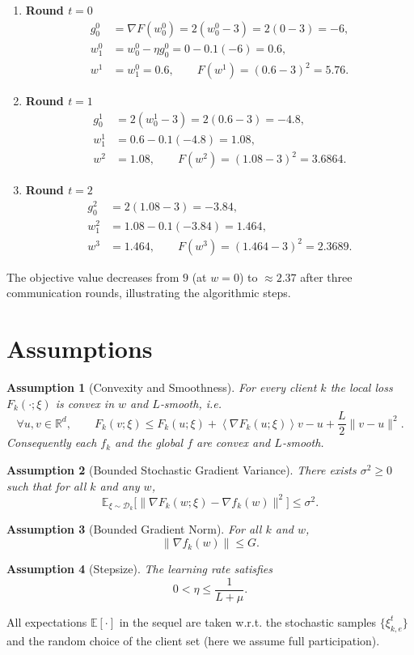 \documentclass{article}
\newtheorem{assumption}{Assumption}
\newcommand{\EE}{\mathbb{E}}
\newcommand{\RR}{\mathbb{R}}
\newcommand{\inner}[1]{\left\langle #1 \right\rangle}
\begin{document}
\begin{enumerate}[label=\textbf{Iteration \arabic*:}]
    \item \textbf{Round $t=0$}
    \begin{align*}
        g^{0}_{0}&=\nabla F(w^{0}_{0}) = 2(w^{0}_{0}-3)=2(0-3)=-6,\\
        w^{0}_{1}&=w^{0}_{0}-\eta g^{0}_{0}=0-0.1(-6)=0.6,\\
        w^{1}&=w^{0}_{1}=0.6,\qquad 
        F(w^{1})=(0.6-3)^2=5.76.
    \end{align*}
    \item \textbf{Round $t=1$}
    \begin{align*}
        g^{1}_{0}&=2(w^{1}_{0}-3)=2(0.6-3)=-4.8,\\
        w^{1}_{1}&=0.6-0.1(-4.8)=1.08,\\
        w^{2}&=1.08,\qquad 
        F(w^{2})=(1.08-3)^2=3.6864.
    \end{align*}
    \item \textbf{Round $t=2$}
    \begin{align*}
        g^{2}_{0}&=2(1.08-3)=-3.84,\\
        w^{2}_{1}&=1.08-0.1(-3.84)=1.464,\\
        w^{3}&=1.464,\qquad 
        F(w^{3})=(1.464-3)^2=2.3689.
    \end{align*}
\end{enumerate}
The objective value decreases from $9$ (at $w=0$) to $\approx2.37$ after three communication rounds, illustrating the algorithmic steps.

\newpage
\section*{Assumptions}
\begin{assumption}[Convexity and Smoothness]\label{ass:conv-smooth}
For every client $k$ the local loss $F_k(\cdot;\xi)$ is convex in $w$ and $L$‑smooth, i.e.
\[
\forall u,v\in\RR^d,\qquad 
F_k(v;\xi)\le F_k(u;\xi)+\inner{\nabla F_k(u;\xi)}{v-u}+\frac{L}{2}\|v-u\|^2 .
\]
Consequently each $f_k$ and the global $f$ are convex and $L$‑smooth.
\end{assumption}
\begin{assumption}[Bounded Stochastic Gradient Variance]\label{ass:variance}
There exists $\sigma^2\ge0$ such that for all $k$ and any $w$,
\[
\EE_{\xi\sim\mathcal D_k}\!\big[\|\nabla F_k(w;\xi)-\nabla f_k(w)\|^2\big]\le\sigma^2 .
\]
\end{assumption}
\begin{assumption}[Bounded Gradient Norm]\label{ass:bounded-grad}
For all $k$ and $w$,
\[
\|\nabla f_k(w)\|\le G .
\]
\end{assumption}
\begin{assumption}[Stepsize]\label{ass:stepsize}
The learning rate satisfies 
\[
0<\eta\le\frac{1}{L+\mu}.
\]
\end{assumption}
All expectations $\EE[\cdot]$ in the sequel are taken w.r.t. the stochastic samples $\{\xi^{t}_{k,e}\}$ and the random choice of the client set (here we assume full participation).
\end{document}
